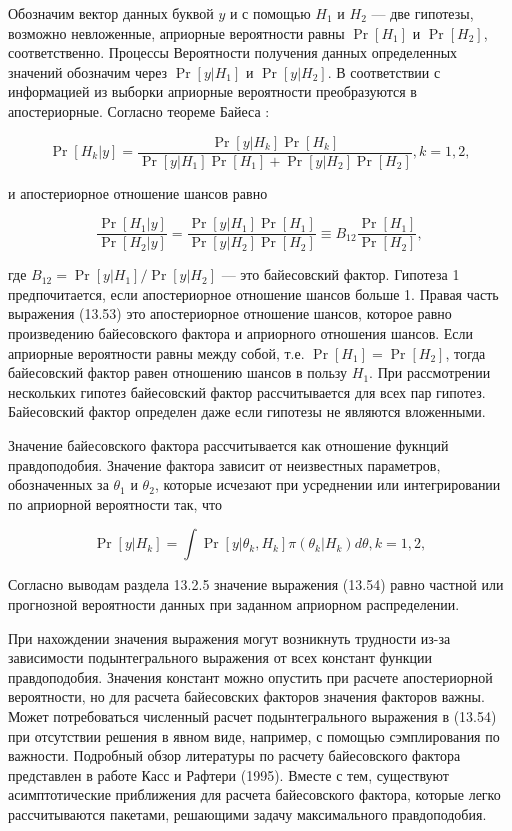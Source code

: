 Обозначим вектор данных буквой $y$  и с помощью $H_1$ и $H_2$ --- две гипотезы, возможно невложенные, априорные вероятности равны $\Pr[H_1]$ и $\Pr[H_2]$, соответственно. Процессы Вероятности получения данных определенных значений обозначим через $\Pr[y|H_1]$ и $\Pr[y|H_2]$. %
В соответствии с информацией из выборки  априорные вероятности преобразуются в апостериорные. Согласно теореме Байеса :

\begin{equation}
\Pr[H_k|y]=\dfrac{\Pr[y|H_k]\Pr[H_k]}{\Pr[y|H_1]\Pr[H_1]+\Pr[y|H_2]\Pr[H_2]}, k=1,2,
\end{equation}

и апостериорное отношение шансов равно

\begin{equation}
\dfrac{\Pr[H_{1}|y]}{\Pr[H_2|y]}=\dfrac{\Pr[y|H_1]\Pr[H_1]}{\Pr[y|H_2]\Pr[H_2]}{\equiv}B_{12}\dfrac{\Pr[H_1]}{\Pr[H_2]},
\end{equation}
 
где $B_{12}=\Pr[y|H_1]/\Pr[y|H_2]$ --- это байесовский фактор. Гипотеза 1 предпочитается, если апостериорное отношение шансов больше 1. Правая часть выражения (13.53) это апостериорное отношение шансов, которое равно произведению байесовского фактора и априорного отношения шансов. Если априорные вероятности равны между собой, т.е. $\Pr[H_1]=\Pr[H_2]$, тогда байесовский фактор равен отношению шансов в пользу $H_1$. При рассмотрении нескольких гипотез байесовский фактор рассчитывается для всех пар гипотез. Байесовский фактор определен даже если гипотезы не являются вложенными. 

Значение байесовского фактора рассчитывается как отношение фукнций правдоподобия. Значение фактора зависит от неизвестных параметров, обозначенных за $\theta_1$ и $\theta_2$, которые исчезают при усреднении или интегрировании  по априорной вероятности так, что

\begin{equation}
\Pr[y|H_k]=\int{\Pr[y|\theta_k,H_k]\pi(\theta_k|H_k)d\theta}, k=1,2,
\end{equation}

Согласно выводам раздела 13.2.5 значение выражения (13.54) равно частной или прогнозной вероятности данных при заданном априорном распределении.

При нахождении значения выражения могут возникнуть трудности из-за зависимости подынтегрального выражения от всех констант функции правдоподобия. Значения констант можно опустить при расчете апостериорной вероятности, но для расчета байесовских факторов значения факторов важны. Может потребоваться численный расчет подынтегрального выражения в (13.54) при отсутствии решения в явном виде, например, с помощью сэмплирования по важности. Подробный обзор литературы по расчету байесовского фактора представлен в работе Касс и Рафтери (1995). Вместе с тем, существуют асимптотические приближения для расчета байесовского фактора, которые легко рассчитываются пакетами, решающими задачу максимального правдоподобия.

